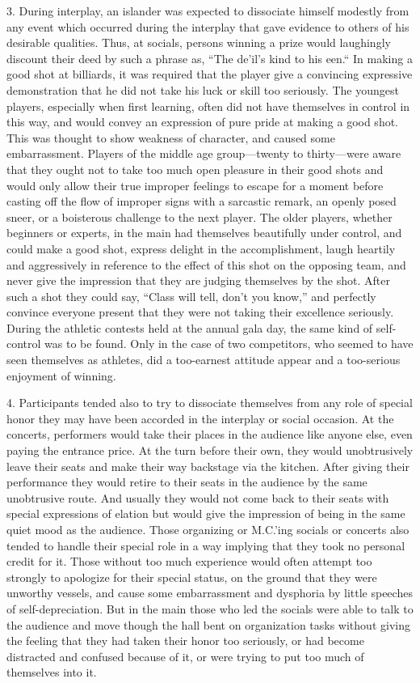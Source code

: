 \documentclass[openany,nobib]{tufte-book}
\begin{document}
3. During interplay, an islander was expected to dissociate himself
modestly from any event which occurred during the interplay that gave
evidence to others of his desirable qualities. Thus, at socials, persons
winning a prize would laughingly discount their deed by such a phrase
as, ``The de'il's kind to his een.`` In making a good shot at billiards,
it was required that the player give a convincing expressive
demonstration that he did not take his luck or skill too seriously. The
youngest players, especially when first learning, often did not have
themselves in control in this way, and would convey an expression of
pure pride at making a good shot. This was thought to show weakness of
character, and caused some embarrassment. Players of the middle age
group---twenty to thirty---were aware that they ought not to take too
much open pleasure in their good shots and would only allow their true
improper feelings to escape for a moment before casting off the flow of
improper signs with a sarcastic remark, an openly posed sneer, or a
boisterous challenge to the next player. The older players, whether
beginners or experts, in the main had themselves beautifully under
control, and could make a good shot, express delight in the
accomplishment, laugh heartily and aggressively in reference to the
effect of this shot on the opposing team, and never give the impression
that they are judging themselves by the shot. After such a shot they
could say, ``Class will tell, don't you know,'' and perfectly convince
everyone present that they were not taking their excellence seriously.
During the athletic contests held at the annual gala day, the same kind
of self-control was to be found. Only in the case of two competitors,
who seemed to have seen themselves as athletes, did a too-earnest
attitude appear and a too-serious enjoyment of winning.

4. Participants tended also to try to dissociate themselves from any
role of special honor they may have been accorded in the interplay or
social occasion. At the concerts, performers would take their places in
the audience like anyone else, even paying the entrance price. At the
turn before their own, they would unobtrusively leave their seats and
make their way backstage via the kitchen. After giving their performance
they would retire to their seats in the audience by the same unobtrusive
route. And usually they would not come back to their seats with special
expressions of elation but would give the impression of being in the
same quiet mood as the audience. Those organizing or M.C.'ing socials or
concerts also tended to handle their special role in a way implying that
they took no personal credit for it. Those without too much experience
would often attempt too strongly to apologize for their special status,
on the ground that they were unworthy vessels, and cause some
embarrassment and dysphoria by little speeches of self-depreciation. But
in the main those who led the socials were able to talk to the audience
and move though the hall bent on organization tasks without giving the
feeling that they had taken their honor too seriously, or had become
distracted and confused because of it, or were trying to put too much of
themselves into it.
\end{document}
